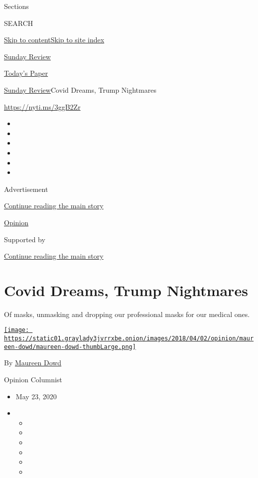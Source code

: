 Sections

SEARCH

\protect\hyperlink{site-content}{Skip to
content}\protect\hyperlink{site-index}{Skip to site index}

\href{https://www.nytimes3xbfgragh.onion/section/opinion/sunday}{Sunday
Review}

\href{https://myaccount.nytimes3xbfgragh.onion/auth/login?response_type=cookie\&client_id=vi}{}

\href{https://www.nytimes3xbfgragh.onion/section/todayspaper}{Today's
Paper}

\href{/section/opinion/sunday}{Sunday Review}\textbar{}Covid Dreams,
Trump Nightmares

\url{https://nyti.ms/3ggB2Zr}

\begin{itemize}
\item
\item
\item
\item
\item
\item
\end{itemize}

Advertisement

\protect\hyperlink{after-top}{Continue reading the main story}

\href{/section/opinion}{Opinion}

Supported by

\protect\hyperlink{after-sponsor}{Continue reading the main story}

\hypertarget{covid-dreams-trump-nightmares}{%
\section{Covid Dreams, Trump
Nightmares}\label{covid-dreams-trump-nightmares}}

Of masks, unmasking and dropping our professional masks for our medical
ones.

\href{https://www.nytimes3xbfgragh.onion/by/maureen-dowd}{\texttt{[image: https://static01.graylady3jvrrxbe.onion/images/2018/04/02/opinion/maureen-dowd/maureen-dowd-thumbLarge.png]}}

By \href{https://www.nytimes3xbfgragh.onion/by/maureen-dowd}{Maureen
Dowd}

Opinion Columnist

\begin{itemize}
\item
  May 23, 2020
\item
  \begin{itemize}
  \item
  \item
  \item
  \item
  \item
  \item
  \end{itemize}
\end{itemize}

